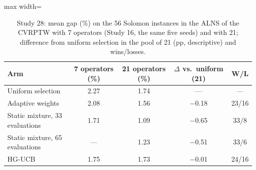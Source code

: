 \begin{table}[t]
\caption{Study 28: mean gap (\%) on the 56 Solomon instances in the ALNS of the CVRPTW with 7 operators (Study 16, the same five seeds) and with 21; difference from uniform selection in the pool of 21 (pp, descriptive) and wins/losses.}\label{tab:s28a}
\centering
\small
\begin{adjustbox}{max width=\linewidth}
\begin{tabular}{lcccc}
\toprule
Arm & 7 operators (\%) & 21 operators (\%) & $\Delta$ vs.\ uniform (21) & W/L \\
\midrule
Uniform selection & 2.27 & 1.74 & --- & --- \\
Adaptive weights & 2.08 & 1.56 & $-$0.18 & 23/16 \\
Static mixture, 33 evaluations & 1.71 & 1.09 & $-$0.65 & 33/8 \\
Static mixture, 65 evaluations & --- & 1.23 & $-$0.51 & 33/6 \\
HG-UCB & 1.75 & 1.73 & $-$0.01 & 24/16 \\
\bottomrule
\end{tabular}
\end{adjustbox}
\end{table}
